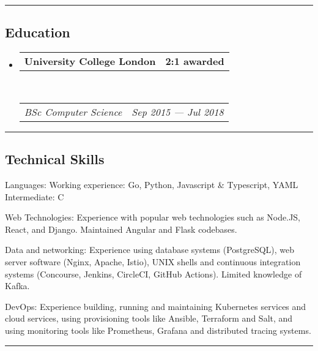 \documentclass[11pt,a4paper]{article}
\makeatletter
\newenvironment{indentsection}[1]%
{\begin{list}{}%
	{\setlength{\leftmargin}{#1}}%
	\item[]%
}
{\end{list}}
\newcommand{\headerrow}[2]
{\begin{tabular*}{\linewidth}{l@{\extracolsep{\fill}}r}
	#1 &
	#2 \\
\end{tabular*}}
\makeatother
\begin{document}
 \vspace{-0.4em}
 \hrule
 \vspace{-1.2em}
 \subsection*{Education}

\begin{itemize}
	\parskip=0.1em

	\item
	\headerrow%
		{\textbf{University College London}}
		{\textbf{2:1 awarded}}\\
	\headerrow%
		{\emph{BSc Computer Science}}
		{\emph{Sep 2015 --- Jul 2018}}

\end{itemize}

\vspace{-0.4em}
\hrule
\vspace{-1.2em}

\subsection*{Technical Skills}

\begin{indentsection}{\parindent}
\begin{description*}
	\item[Languages:]
	    Working experience: Go, Python, Javascript \& Typescript, YAML\\
	    Intermediate: C
	\item[Web Technologies:]
	    Experience with popular web technologies such as Node.JS, React, and Django. Maintained Angular and Flask codebases.
	\item[Data and networking:]
	    Experience using database systems (PostgreSQL), web server software (Nginx, Apache, Istio), UNIX shells and continuous integration systems (Concourse, Jenkins, CircleCI, GitHub Actions). Limited knowledge of Kafka.
	\item[DevOps:]
	    Experience building, running and maintaining Kubernetes
    	    services and cloud services, using provisioning tools like Ansible,
    	    Terraform and Salt, and using monitoring tools like Prometheus, Grafana
    	    and distributed tracing systems.
\end{description*}
\end{indentsection}

\vspace{-0.4em}
\hrule
\end{document}
